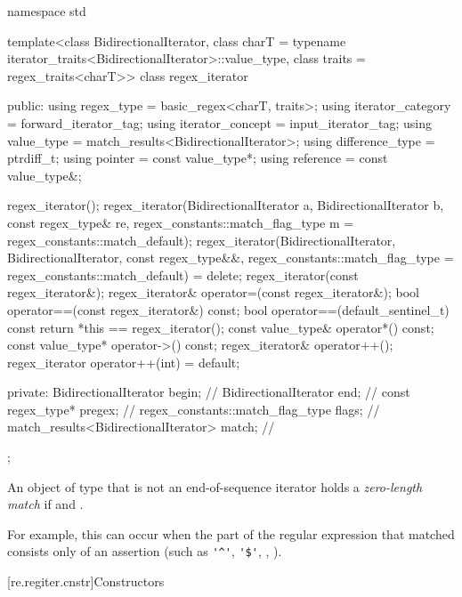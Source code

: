 \begin{codeblock}
namespace std {
  template<class BidirectionalIterator,
           class charT = typename iterator_traits<BidirectionalIterator>::value_type,
           class traits = regex_traits<charT>>
  class regex_iterator {
  public:
    using regex_type        = basic_regex<charT, traits>;
    using iterator_category = forward_iterator_tag;
    using iterator_concept  = input_iterator_tag;
    using value_type        = match_results<BidirectionalIterator>;
    using difference_type   = ptrdiff_t;
    using pointer           = const value_type*;
    using reference         = const value_type&;

    regex_iterator();
    regex_iterator(BidirectionalIterator a, BidirectionalIterator b,
                   const regex_type& re,
                   regex_constants::match_flag_type m = regex_constants::match_default);
    regex_iterator(BidirectionalIterator, BidirectionalIterator,
                   const regex_type&&,
                   regex_constants::match_flag_type = regex_constants::match_default) = delete;
    regex_iterator(const regex_iterator&);
    regex_iterator& operator=(const regex_iterator&);
    bool operator==(const regex_iterator&) const;
    bool operator==(default_sentinel_t) const { return *this == regex_iterator(); }
    const value_type& operator*() const;
    const value_type* operator->() const;
    regex_iterator& operator++();
    regex_iterator operator++(int) = default;

  private:
    BidirectionalIterator                begin;                 // \expos
    BidirectionalIterator                end;                   // \expos
    const regex_type*                    pregex;                // \expos
    regex_constants::match_flag_type     flags;                 // \expos
    match_results<BidirectionalIterator> match;                 // \expos
  };
}
\end{codeblock}

\pnum
An object of type  that is not an end-of-sequence iterator
holds a \textit{zero-length match} if  and
.
\begin{note}
For
example, this can occur when the part of the regular expression that
matched consists only of an assertion (such as \verb|'^'|, \verb|'$'|,
, ).
\end{note}

[re.regiter.cnstr]{Constructors}

